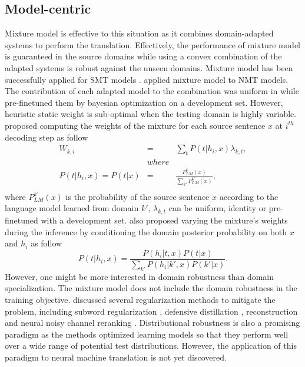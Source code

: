 \subsection{Model-centric}
Mixture model is effective to this situation as it combines domain-adapted systems to perform the translation. Effectively, the performance of mixture model is guaranteed in the source domains while using a convex combination of the adapted systems is robust against the unseen domains. Mixture model has been successfully applied for SMT models \citep{Sennrich12perplexity, Carpuat14linear, Sennrich12mixture}. \citet{Sajjad17neural, Saunders19domain,Freitag16fast} applied mixture model to NMT models. The contribution of each adapted model to the combination was uniform in \citet{Freitag16fast} while \cite{Sajjad17neural} pre-finetuned them by bayesian optimization on a development set. However, heuristic static weight is sub-optimal when the testing domain is highly variable. \citet{Saunders19domain} proposed computing the weights of the mixture for each source sentence $x$ at $i^{th}$ decoding step as follow
\begin{equation}
\begin{array}{rcl}
W_{k,i} &=& \displaystyle{\mathop{\sum}_{t} P(t|h_i,x)\lambda_{k,t}}, \\
&where& \\
P(t|h_i,x) = P(t|x) &=& \frac{\displaystyle{P^k_{LM}(x)}}{\displaystyle{\mathop{\sum}_{k'} P^{k'}_{LM}(x)}},\\
\end{array}
\end{equation}
where $P^{k'}_{LM}(x)$ is the probability of the source sentence $x$ according to the language model learned from domain $k'$, $\lambda_{k,t}$ can be uniform, identity or pre-finetuned with a development set. \citet{Saunders19domain} also proposed varying the mixture's weights during the inference by conditioning the domain posterior probability on both $x$ and $h_i$ as follow
\begin{equation}
P(t|h_i,x) = \frac{P(h_i|t,x) P(t|x)}{\displaystyle{\mathop{\sum}_{k'} P(h_i|k',x) P(k'|x)}}.
\end{equation} 
However, one might be more interested in domain robustness than domain specialization. The mixture model does not include the domain robustness in the training objective. \cite{Muller20domain} discussed several regularization methods to mitigate the problem, including subword regularization \citep{Taku18subword}, defensive distillation \citep{Papernot16distillation}, reconstruction \cite{Tu17neural} and neural noisy channel reranking \citep{Li16mutual}. Distributional robustness \citep{Oren19distributionally,BenTal13robust} is also a promising paradigm as the methods optimized learning models so that they perform well over a wide range of potential test distributions. However, the application of this paradigm to neural machine translation is not yet discovered.

